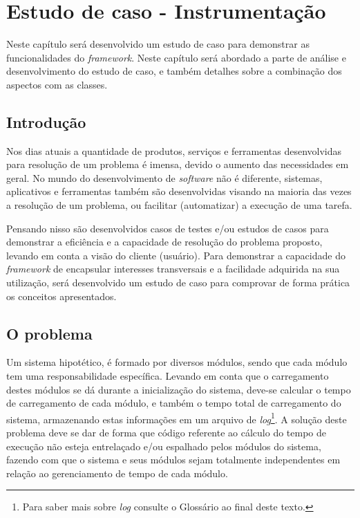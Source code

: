 \documentclass[tc,oneside]{iiufrgs}
\begin{document}
\chapter{Estudo de caso - Instrumentação}
\label{estudodecaso}

Neste capítulo será desenvolvido um estudo de caso para demonstrar as funcionalidades do \textit{framework}. Neste capítulo será abordado a parte de análise e desenvolvimento do estudo de caso, e também detalhes sobre a combinação dos aspectos com as classes.

\section{Introdução}

Nos dias atuais a quantidade de produtos, serviços e ferramentas desenvolvidas para resolução de um problema é imensa, devido o aumento das necessidades em geral. No mundo do desenvolvimento de \textit{software} não é diferente, sistemas, aplicativos e ferramentas também são desenvolvidas visando na maioria das vezes a resolução de um problema, ou facilitar (automatizar) a execução de uma tarefa. 

Pensando nisso são desenvolvidos casos de testes e/ou estudos de casos para demonstrar a eficiência e a capacidade de resolução do problema proposto, levando em conta a visão do cliente (usuário). Para demonstrar a capacidade do \textit{framework} de encapsular interesses transversais e a facilidade adquirida na sua utilização, será desenvolvido um estudo de caso para comprovar de forma prática os conceitos apresentados.

\section{O problema}

Um sistema hipotético, é formado por diversos módulos, sendo que cada módulo tem uma responsabilidade específica. Levando em conta que o carregamento destes módulos se dá durante a inicialização do sistema, deve-se calcular o tempo de carregamento de cada módulo, e também o tempo total de carregamento do sistema, armazenando estas informações em um arquivo de \textit{log}\footnote{Para saber mais sobre \textit{log} consulte o Glossário ao final deste texto.}. A solução deste problema deve se dar de forma que código referente ao cálculo do tempo de execução não esteja entrelaçado e/ou espalhado pelos módulos do sistema, fazendo com que o sistema e seus módulos sejam totalmente independentes em relação ao gerenciamento de tempo de cada módulo.
\end{document}
